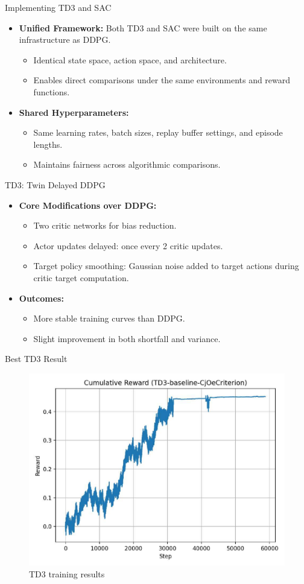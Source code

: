 \documentclass[11pt,aspectratio=169]{beamer}   %
\begin{document}
\begin{frame}{Implementing TD3 and SAC}
	\begin{itemize}
		\item \textbf{Unified Framework:} Both TD3 and SAC were built on the same infrastructure as DDPG.
		\begin{itemize}
			\item Identical state space, action space, and architecture.
			\item Enables direct comparisons under the same environments and reward functions.
		\end{itemize}
		\item \textbf{Shared Hyperparameters:}
		\begin{itemize}
			\item Same learning rates, batch sizes, replay buffer settings, and episode lengths.
			\item Maintains fairness across algorithmic comparisons.
		\end{itemize}
	\end{itemize}
\end{frame}
\begin{frame}{TD3: Twin Delayed DDPG}
	\begin{itemize}
		\item \textbf{Core Modifications over DDPG:}
		\begin{itemize}
			\item Two critic networks for bias reduction.
			\item Actor updates delayed: once every 2 critic updates.
			\item Target policy smoothing: Gaussian noise added to target actions during critic target computation.
		\end{itemize}
		\item \textbf{Outcomes:}
		\begin{itemize}
			\item More stable training curves than DDPG.
			\item Slight improvement in both shortfall and variance.
		\end{itemize}
	\end{itemize}
\end{frame}

\begin{frame}{Best TD3 Result}
	\begin{figure}[ht]
		\centering
		\includegraphics[width=0.55\linewidth]{td3_cumulative_reward.pdf}
		\caption{TD3 training results}
	\end{figure}
\end{frame}
\end{document}
